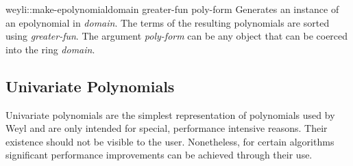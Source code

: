 \begin{functiondef}{weyli::make-epolynomial}{domain greater-fun
poly-form}
Generates an instance of an {\sf epolynomial} in {\em domain}.  The
terms of the resulting polynomials are sorted using {\em greater-fun}.
The argument {\em poly-form} can be any object that can be coerced
into the ring {\em domain}.
\end{functiondef}


\subsection{Univariate Polynomials}
\label{UniPoly:Rep:Sec}

Univariate polynomials are the simplest representation of polynomials
used by Weyl and are only intended for special, performance intensive
reasons.  Their existence should not be visible to the user.
Nonetheless, for certain algorithms significant performance
improvements can be achieved through their use.

